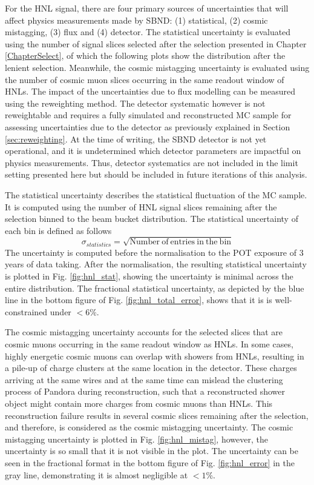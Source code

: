 For the HNL signal, there are four primary sources of uncertainties that will affect physics measurements made by SBND: (1) statistical, (2) cosmic mistagging, (3) flux and (4) detector. 
The statistical uncertainty is evaluated using the number of signal slices selected after the selection presented
 in Chapter \ref{ChapterSelect}, of which the following plots show the distribution after the lenient selection.
Meanwhile, the cosmic mistagging uncertainty is evaluated using the number of cosmic muon slices occurring in the same readout window of HNLs.
The impact of the uncertainties due to flux modelling can be measured using the reweighting method.
The detector systematic however is not reweightable and requires a fully simulated and reconstructed MC sample for assessing uncertainties due to the detector as previously explained in Section \ref{sec:reweighting}.
At the time of writing, the SBND detector is not yet operational, and it is undetermined which detector parameters are impactful on physics measurements.
Thus, detector systematics are not included in the limit setting presented here but should be included in future
 iterations of this analysis.

The statistical uncertainty describes the statistical fluctuation of the MC sample.
It is computed using the number of HNL signal slices remaining after the selection binned to the beam bucket distribution.
The statistical uncertainty of each bin is defined as follows 
\begin{equation}
\label{eq:stat_err}
\sigma_{statistics} = \sqrt{\mathrm{Number\ of\ entries\ in\ the\ bin}}
\end{equation}
The uncertainty is computed before the normalisation to the POT exposure of 3 years of data taking.
After the normalisation, the resulting statistical uncertainty is plotted in Fig. \ref{fig:hnl_stat}, showing the uncertainty is minimal across the entire distribution.
The fractional statistical uncertainty, as depicted by the blue line in the bottom figure of Fig. \ref{fig:hnl_total_error}, shows that it is is well-constrained under $< 6\%$.

The cosmic mistagging uncertainty accounts for the selected slices that are cosmic muons occurring in the same readout window as HNLs.
In some cases, highly energetic cosmic muons can overlap with showers from HNLs, resulting in a pile-up of charge clusters at the same location in the detector.
These charges arriving at the same wires and at the same time can mislead the clustering process of Pandora during reconstruction, such that a reconstructed shower object might contain more charges from cosmic muons than HNLs.
This reconstruction failure results in several cosmic slices remaining after the selection, and therefore, is considered as the cosmic mistagging uncertainty.                                                                
The cosmic mistagging uncertainty is plotted in Fig. \ref{fig:hnl_mistag}, however, the uncertainty is so small that it is not visible in the plot.                                                                              
The uncertainty can be seen in the fractional format in the bottom figure of Fig. \ref{fig:hnl_error} in the gray line, demonstrating it is almost negligible at $< 1\%$. 

